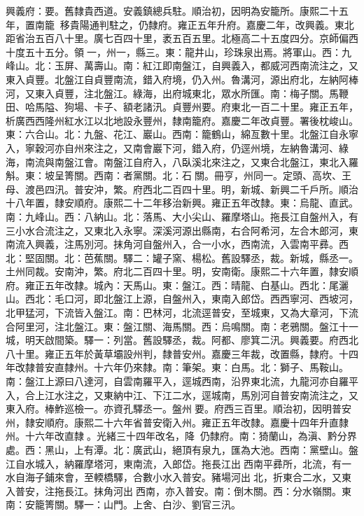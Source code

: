 \begin{pinyinscope}
興義府：要。舊隸貴西道。安義鎮總兵駐。順治初，因明為安籠所。康熙二十五年，置南籠，移貴陽通判駐之，仍隸府。雍正五年升府。嘉慶二年，改興義。東北距省治五百八十里。廣七百四十里，袤五百五里。北極高二十五度四分。京師偏西十度五十五分。領一，州一，縣三。東：龍井山，珍珠泉出焉。將軍山。西：九峰山。北：玉屏、萬壽山。南：紅江即南盤江，自興義入，都威河西南流注之，又東入貞豐。北盤江自貞豐南流，錯入府境，仍入州。魯溝河，源出府北，左納阿棒河，又東入貞豐，注北盤江。綠海，出府城東北，眾水所匯。南：梅子關。馬鞭田、哈馬隘、狗場、卡子、額老諸汛。貞豐州要。府東北一百二十里。雍正五年，析廣西西隆州紅水江以北地設永豐州，隸南籠府。嘉慶二年改貞豐。署後枕峻山。東：六合山。北：九盤、花江、巖山。西南：籠鶴山，綿亙數十里。北盤江自永寧入，寧穀河亦自州來注之，又南會巖下河，錯入府，仍逕州境，左納魯溝河、綠海，南流與南盤江會。南盤江自府入，八臥溪北來注之，又東合北盤江，東北入羅斛。東：坡呈箐關。西南：者黨關。北：石關。冊亨，州同一。定頭、高坎、王母、渡邑四汛。普安沖，繁。府西北二百四十里。明，新城、新興二千戶所。順治十八年置，隸安順府。康熙二十二年移治新興。雍正五年改隸。東：烏龍、直武。南：九峰山。西：八納山。北：落馬、大小尖山、羅摩塔山。拖長江自盤州入，有三小水合流注之，又東北入永寧。深溪河源出縣南，右合阿希河，左合木郎河，東南流入興義，注馬別河。抹角河自盤州入，合一小水，西南流，入雲南平彞。西北：堅固關。北：芭蕉關。驛二：罐子窯、楊松。舊設驛丞，裁。新城，縣丞一。土州同裁。安南沖，繁。府北二百四十里。明，安南衛。康熙二十六年置，隸安順府。雍正五年改隸。城內：天馬山。東：盤江。西：晴龍、白基山。西北：尾灑山。西北：毛口河，即北盤江上源，自盤州入，東南入郎岱。西西寧河、西坡河，北甲猛河，下流皆入盤江。南：巴林河，北流逕普安，至城東，又為大章河，下流合阿里河，注北盤江。東：盤江關、海馬關。西：烏鳴關。南：老鴉關。盤江十一城，明天啟間築。驛一：列當。舊設驛丞，裁。阿都、廖箕二汛。興義要。府西北八十里。雍正五年於黃草壩設州判，隸普安州。嘉慶三年裁，改置縣，隸府。十四年改隸普安直隸州。十六年仍來隸。南：筆架。東：白馬。北：獅子、馬鞍山。南：盤江上源曰八達河，自雲南羅平入，逕城西南，沿界東北流，九龍河亦自羅平入，合上江水注之，又東納中江、下江二水，逕城南，馬別河自普安南流注之，又東入府。棒鮓巡檢一。亦資孔驛丞一。盤州要。府西三百里。順治初，因明普安州，隸安順府。康熙二十六年省普安衛入州。雍正五年改隸。嘉慶十四年升直隸州。十六年改直隸。光緒三十四年改名，降，仍隸府。南：猗蘭山，為滇、黔分界處。西：黑山，上有潭。北：廣武山，絕頂有泉九，匯為大池。西南：黨壁山。盤江自水城入，納羅摩塔河，東南流，入郎岱。拖長江出西南平彞所，北流，有一水自海子鋪來會，至輭橋驛，合數小水入普安。豬場河出北，折東合二水，又東入普安，注拖長江。抹角河出西南，亦入普安。南：倒木關。西：分水嶺關。東南：安籠箐關。驛一：山門。上舍、白沙、劉官三汛。


\end{pinyinscope}
